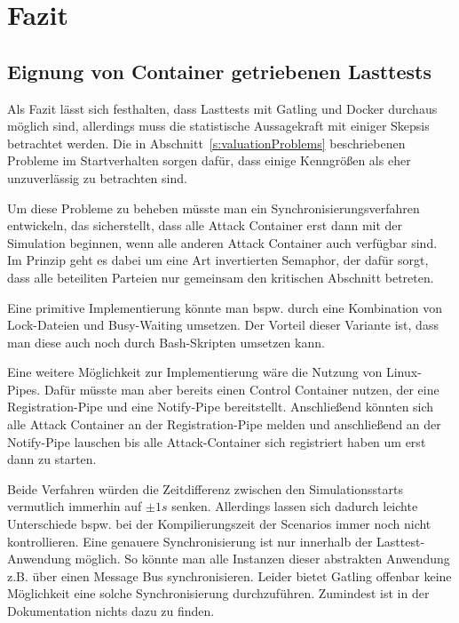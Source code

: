 \chapter{Fazit}

\section{Eignung von Container getriebenen Lasttests}
\label{s:conclusionContainerDrivenStressTests}

Als Fazit l\"asst sich festhalten, dass Lasttests mit Gatling und Docker durchaus m\"oglich sind, allerdings muss die statistische Aussagekraft mit einiger Skepsis betrachtet werden.
Die in Abschnitt~\ref{s:valuationProblems} beschriebenen Probleme im Startverhalten sorgen daf\"ur, dass einige Kenngr\"o\ss{}en als eher unzuverl\"assig zu betrachten sind.

Um diese Probleme zu beheben m\"usste man ein Synchronisierungsverfahren entwickeln, das sicherstellt, dass alle Attack Container erst dann mit der Simulation beginnen, wenn alle anderen Attack Container auch verf\"ugbar sind.
Im Prinzip geht es dabei um eine Art invertierten Semaphor, der daf\"ur sorgt, dass alle beteiliten Parteien nur gemeinsam den kritischen Abschnitt betreten.

Eine primitive Implementierung k\"onnte man bspw. durch eine Kombination von Lock-Dateien und Busy-Waiting umsetzen.
Der Vorteil dieser Variante ist, dass man diese auch noch durch Bash-Skripten umsetzen kann.

Eine weitere M\"oglichkeit zur Implementierung w\"are die Nutzung von Linux-Pipes.
Daf\"ur m\"usste man aber bereits einen Control Container nutzen, der eine \glqq{}Registration-Pipe\grqq{} und eine \glqq{}Notify-Pipe\grqq{} bereitstellt.
Anschlie\ss{}end k\"onnten sich alle Attack Container an der \glqq{}Registration-Pipe\grqq{} melden und anschlie\ss{}end an der \glqq{}Notify-Pipe\grqq{} lauschen bis alle Attack-Container sich registriert haben um erst dann zu starten.

Beide Verfahren w\"urden die Zeitdifferenz zwischen den Simulationsstarts vermutlich immerhin auf $\pm 1s$ senken.
Allerdings lassen sich dadurch leichte Unterschiede bspw. bei der Kompilierungszeit der Scenarios immer noch nicht kontrollieren.
Eine genauere Synchronisierung ist nur innerhalb der Lasttest-Anwendung m\"oglich.
So k\"onnte man alle Instanzen dieser abstrakten Anwendung z.B. \"uber einen Message Bus synchronisieren.
Leider bietet Gatling offenbar keine M\"oglichkeit eine solche Synchronisierung durchzuf\"uhren.
Zumindest ist in der Dokumentation nichts dazu zu finden.

